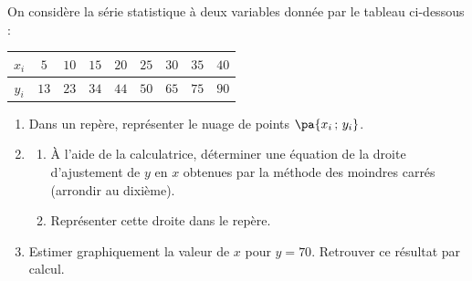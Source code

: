 \begin{methode}
	On considère la série statistique à deux variables donnée par le tableau ci-dessous :

	\begin{center}
		\begin{tabular}{|c|c|c|c|c|c|c|c|c|}
			\hline
			\ccg $x_i$ & $5$  & $10$ & $15$ & $20$ & $25$ & $30$ & $35$ & $40$ \\ \hline
			\ccg $y_i$ & $13$ & $23$ & $34$ & $44$ & $50$ & $65$ & $75$ & $90$ \\ \hline
		\end{tabular}
	\end{center}

	\begin{enumerate}
		\item Dans un repère, représenter le nuage de points $\pa{x_i\,;\,y_i}$.
		\item
		      \begin{enumerate}
			      \item À l'aide de la calculatrice, déterminer une équation de la droite d'ajustement de $y$ en $x$ obtenues par la méthode des moindres carrés (arrondir au dixième).
			      \item Représenter cette droite dans le repère.
		      \end{enumerate}
		\item Estimer graphiquement la valeur de $x$ pour $y = 70$. Retrouver ce résultat par calcul.
	\end{enumerate}


\end{methode}
